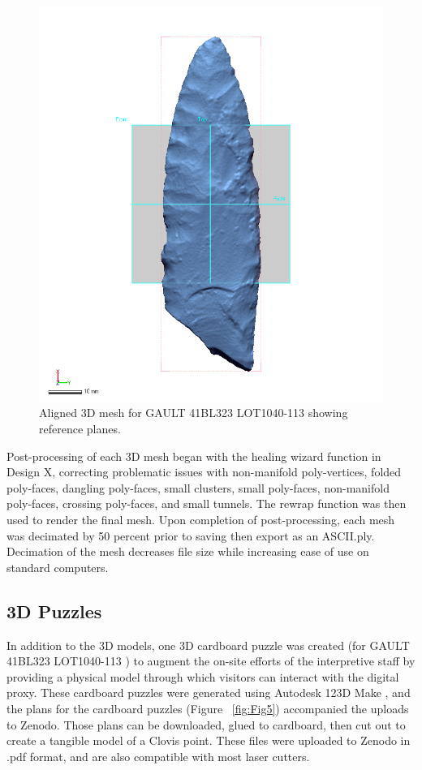 \documentclass[preprint,12pt]{elsarticle}
\begin{document}
\begin{figure}[ht]\centering
\includegraphics[width=0.85\linewidth]{Fig4}
\caption{Aligned 3D mesh for GAULT 41BL323 LOT1040-113 showing reference planes.}
\label{fig:Fig4}
\end{figure}

Post-processing of each 3D mesh began with the healing wizard function in Design X, correcting problematic issues with non-manifold poly-vertices, folded poly-faces, dangling poly-faces, small clusters, small poly-faces, non-manifold poly-faces, crossing poly-faces, and small tunnels. The rewrap function was then used to render the final mesh. Upon completion of post-processing, each mesh was decimated by 50 percent prior to saving then export as an ASCII.ply. Decimation of the mesh decreases file size while increasing ease of use on standard computers.

\subsection{3D Puzzles}

In addition to the 3D models, one 3D cardboard puzzle was created (for GAULT 41BL323 LOT1040-113 \cite{Selden:Z27}) to augment the on-site efforts of the interpretive staff by providing a physical model through which visitors can interact with the digital proxy. These cardboard puzzles were generated using Autodesk 123D Make \cite{Autodesk:1}, and the plans for the cardboard puzzles (Figure ~\ref{fig:Fig5}) accompanied the uploads to Zenodo. Those plans can be downloaded, glued to cardboard, then cut out to create a tangible model of a Clovis point. These files were uploaded to Zenodo in .pdf format, and are also compatible with most laser cutters.
\end{document}

